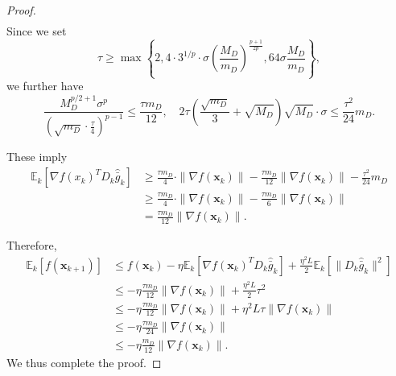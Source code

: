 \documentclass[10pt,a4paper]{amsart}
\newcommand{\barg}{\bar{g}}
\newcommand{\bx}{\boldsymbol{x}}
\begin{document}
\begin{proof}
\begin{align*}
\end{align*}
Since we set 
\begin{equation*}
    \tau \geq \max\left\{2,  4\cdot 3^{1/p}\cdot \sigma\left(\frac{M_D}{m_D}\right)^{\frac{p+1}{2p}}, 64 \sigma \frac{M_D}{m_D} \right\},
\end{equation*}
we further have
\begin{equation*}
    \frac{M_D^{p/2+1} \sigma^p}{\left(\sqrt{m_D}\cdot\frac{\tau}{4}\right)^{p-1}} \leq \frac{\tau m_D}{12}, \quad 2\tau \left( \frac{\sqrt{m_D}}{3} + \sqrt{M_D}\right) \sqrt{M_D} \cdot \sigma \leq \frac{\tau^2}{24}m_D.
\end{equation*}

These imply
\begin{align*}
    \mathbb{E}_k[\nabla f(x_k)^T D_k \widehat{\barg}_k ]
    & \geq   \frac{\tau m_D}{4} \cdot \| \nabla f(\bx_k)\| -  \frac{\tau m_D}{12}\|\nabla f(\bx_k)\| - \frac{\tau^2}{24}m_D\\
    & \geq \frac{\tau m_D}{4} \cdot \| \nabla f(\bx_k)\| -  \frac{\tau m_D}{6}\|\nabla f(\bx_k)\|\\
    & = \frac{\tau m_D}{12}\|\nabla f(\bx_k)\|.
\end{align*}

Therefore, 
 \begin{align*}
\mathbb{E}_k[f(\bx_{k+1})]  & \leq f(\bx_k) - \eta  \mathbb{E}_k[\nabla f(\bx_k)^T D_k\widehat{\barg}_k] + \frac{\eta^2 L }{2} \mathbb{E}_k[\|D_k\widehat{\barg}_k\|^2]\\
& \leq - \eta \frac{\tau m_D}{12}\|\nabla f(\bx_k)\| + \frac{\eta^2 L }{2}\tau^2 \\
& \leq - \eta \frac{\tau m_D}{12}\|\nabla f(\bx_k)\| + \eta^2 L  \tau \|\nabla f(\bx_k)\| \\
& \leq - \eta \frac{\tau m_D}{24}\|\nabla f(\bx_k)\| \\
& \leq - \eta \frac{ m_D}{12}\|\nabla f(\bx_k)\|.
\end{align*}
We thus complete the proof.
\end{proof}
\end{document}
